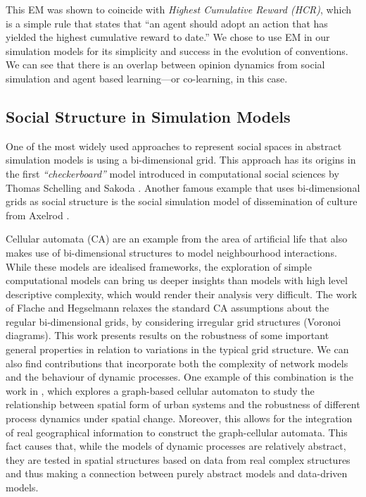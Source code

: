 \documentclass[preprint,number]{elsarticle}
\begin{document}
	This EM was shown to coincide with \textit{Highest Cumulative Reward (HCR)}, which is a simple rule that states that ``an agent should adopt an action that has yielded the highest cumulative reward to date.'' We chose to use EM in our simulation models for its simplicity and success in the evolution of conventions. We can see that there is an overlap between opinion dynamics from social simulation and agent based learning---or co-learning, in this case.
	
	\subsection{Social Structure in Simulation Models}
\noindent One of the most widely used approaches to represent social spaces in abstract simulation models is using a  bi-dimensional grid. This approach has its origins in the first \textit{``checkerboard''} model introduced in computational social sciences by Thomas Schelling \cite{Schelling1971} and Sakoda \cite{Sakoda1971}. Another famous example that uses bi-dimensional grids as social structure is the social simulation model of dissemination of culture from Axelrod \cite{Axelrod1997}.
	
	Cellular automata (CA) are an example from the area of artificial life that also makes use of bi-dimensional structures to model neighbourhood interactions. While these models are idealised frameworks, the exploration of simple computational models can bring us deeper insights than models with high level descriptive complexity, which would render their analysis very difficult. The work of Flache and Hegselmann \cite{FlacheHegselmann2001} relaxes the standard CA assumptions about the regular bi-dimensional grids, by considering irregular grid structures (Voronoi diagrams). This work presents results on the robustness of some important general properties in relation to variations in the typical grid structure. We can also find contributions that incorporate both the complexity of network models and the behaviour of dynamic processes. One example of this combination is the work in \cite{Sullivan2000}, which explores a graph-based cellular automaton to study the relationship between spatial form of urban systems and the robustness of different process dynamics under spatial change. Moreover, this allows for the integration of real geographical information to construct the graph-cellular automata. This fact causes that, while the models of dynamic processes are relatively abstract, they are tested in spatial structures based on data from real complex structures and thus making a connection between purely abstract models and data-driven models.
	
\end{document}
